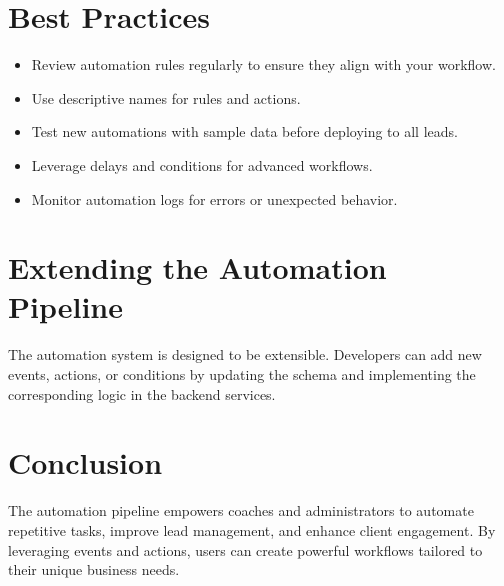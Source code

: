 \documentclass[12pt,a4paper]{article}
\begin{document}
\section{Best Practices}
\begin{itemize}[leftmargin=2em]
    \item Review automation rules regularly to ensure they align with your workflow.
    \item Use descriptive names for rules and actions.
    \item Test new automations with sample data before deploying to all leads.
    \item Leverage delays and conditions for advanced workflows.
    \item Monitor automation logs for errors or unexpected behavior.
\end{itemize}

\section{Extending the Automation Pipeline}
The automation system is designed to be extensible. Developers can add new events, actions, or conditions by updating the schema and implementing the corresponding logic in the backend services.

\section*{Conclusion}
The automation pipeline empowers coaches and administrators to automate repetitive tasks, improve lead management, and enhance client engagement. By leveraging events and actions, users can create powerful workflows tailored to their unique business needs.
\end{document}
